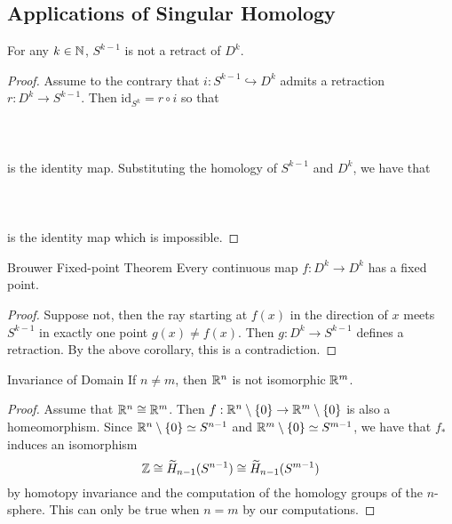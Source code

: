 \documentclass[a4paper]{article}
\begin{document}
\subsection{Applications of Singular Homology}
\begin{crl}{}{} For any $k\in\mathbb{N}$, $S^{k-1}$ is not a retract of $D^k$. \tcbline
\begin{proof}
Assume to the contrary that $i:S^{k-1}\hookrightarrow D^k$ admits a retraction $r:D^k\to S^{k-1}$. Then $\text{id}_{S^k}=r\circ i$ so that \\~\\
\\~\\
is the identity map. Substituting the homology of $S^{k-1}$ and $D^k$, we have that \\~\\
\\~\\
is the identity map which is impossible. 
\end{proof}
\end{crl}

\begin{crl}{Brouwer Fixed-point Theorem}{} Every continuous map $f:D^k\to D^k$ has a fixed point. \tcbline
\begin{proof}
Suppose not, then the ray starting at $f(x)$ in the direction of $x$ meets $S^{k-1}$ in exactly one point $g(x)\neq f(x)$. Then $g:D^k\to S^{k-1}$ defines a retraction. By the above corollary, this is a contradiction. 
\end{proof}
\end{crl}

\begin{crl}{Invariance of Domain}{} If $n\neq m$, then $\mathbb{R}^n$ is not isomorphic $\mathbb{R}^m$. \tcbline
\begin{proof}
Assume that $\mathbb{R}^n\cong\mathbb{R}^m$. Then $f:\mathbb{R}^n\setminus\{0\}\to\mathbb{R}^m\setminus\{0\}$ is also a homeomorphism. Since $\mathbb{R}^n\setminus\{0\}\simeq S^{n-1}$ and $\mathbb{R}^m\setminus\{0\}\simeq S^{m-1}$, we have that $f_\ast$ induces an isomorphism $$\mathbb{Z}\cong\widetilde{H}_{n-1}(S^{n-1})\cong\widetilde{H}_{n-1}(S^{m-1})$$ by homotopy invariance and the computation of the homology groups of the $n$-sphere. This can only be true when $n=m$ by our computations. 
\end{proof}
\end{crl}
\end{document}
